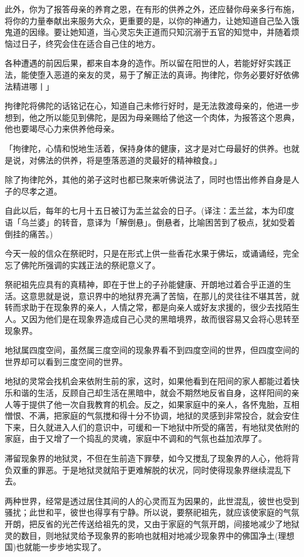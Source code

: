 \documentclass[twoside,openany]{book}
\begin{document}
此外，你为了报答母亲的养育之恩，在有形的供养之外，还应替你母亲多行布施，将你的力量奉献出来服务大众，更重要的是，以你的神通力，让她知道自己坠入饿鬼道的因缘。要让她知道，当心灵忘失正道而只知沉溺于五官的知觉中，并随着烦恼过日子，终究会住在适合自己住的地方。

各种遭遇的前因后果，都来自本身的造作。所以留在阳世的人，若能好好实践正法，能使堕入恶道的亲友的灵，易于了解正法的真谛。拘律陀，你务必要好好依佛法精进哪丨」

拘律陀将佛陀的话铭记在心，知道自己未修行好时，是无法救渡母亲的，他进一步想到，他之所以能见到佛陀，是因为母亲赐给了他这一个肉体，为报答这个恩典，他也要竭尽心力来供养他母亲。

「拘律陀，心情和悦地生活着，保持身体的健康，这才是对亡母最好的供养。也就是说，对佛法的供养，将是堕落恶道的灵最好的精神粮食。」

除了拘律陀外，其他的弟子这时也都已聚来听佛说法了，同时也悟出修养自身是人子的尽孝之道。

自此以后，每年的七月十五日被订为盂兰盆会的日子。({\kaishu 译注：盂兰盆，本为印度语「乌兰婆」的转音，意译为「解倒悬」。倒悬者，比喻困苦到了极点，犹如受着倒挂的痛苦。})

今天一般的信众在祭祀时，只是在形式上供一些香花水果于佛坛，或诵诵经，完全忘了佛陀所强调的实践正法的祭祀意义了。

祭祀祖先应具有的真精神，即在于世上的子孙能健康、开朗地过着合乎正道的生活。这意思就是说，意识界中的地狱界充满了苦恼，在那儿的灵往往不堪其苦，就转而求助于在现象界的亲人，人情之常，都是向亲人或好友求援的，很少去找陌生人。又因为他们是在现象界造成自己心灵的黑暗境界，故而很容易又会将心思转至现象界。

地狱属四度空间，虽然属三度空间的现象界看不到四度空间的世界，但四度空间的世界却可以看到三度空间的世界。

地狱的灵常会找机会来依附生前的家，这时，如果他看到在阳间的家人都能过着快乐和谐的生活，反顾自己却生活在黑暗中，就会不期然地反省自身，这样阳间的亲人等于提供了他一次自我教育的机会。反之，如果家庭中的亲人，各怀鬼胎，互相憎恨、不满，把家庭的气氛搅和得十分不协调，地狱的灵感到非常投合，就会安住下来，日久就进入人们的意识中，可缓和一下地狱中所受的痛苦，有地狱灵依附的家庭，由于又增了一个捣乱的灵魂，家庭中不调和的气氛也益加浓厚了。

滞留现象界的地狱灵，不但在生前造下罪孽，如今又搅乱了现象界的人心，他将背负双重的罪恶。于是地狱灵就陷于更难解脱的状况，同时使得现象界继续混乱下去。

两种世界，经常是透过居住其间的人的心灵而互为因果的，此世混乱，彼世也受到骚扰；此世和平，彼世也得享有宁静。所以说，要祭祀祖先，就应该使家庭的气氛开朗，把反省的光芒传送给祖先的灵，又由于家庭的气氛开朗，间接地减少了地狱灵的数目，则地狱灵给予现象界的影响也就相对地减少现象界中的佛国净土(理想国)也就能一步步地实现了。
\end{document}
